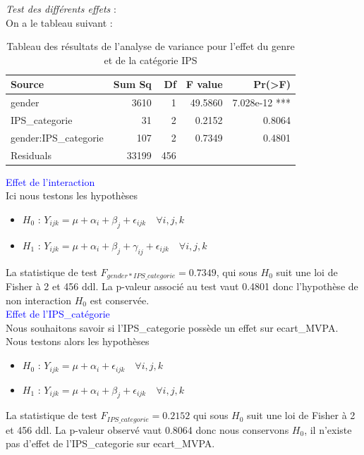 \documentclass[12pt,a4paper]{article}
\begin{document}
	\textit{Test des différents effets} : \\
	On a le tableau suivant : 
	\begin{table}[H]
		\centering
		\begin{tabular}{lrrrr}
			\toprule
			Source & Sum Sq & Df & F value & Pr(>F) \\ 
			\midrule
			gender                & 3610   & 1  & 49.5860 & 7.028e-12 *** \\ 
			IPS\_categorie        & 31     & 2  & 0.2152  & 0.8064    \\ 
			gender:IPS\_categorie & 107    & 2  & 0.7349  & 0.4801    \\ 
			Residuals             & 33199  & 456 &         &           \\ 
			\bottomrule
		\end{tabular}
		\caption{Tableau des résultats de l'analyse de variance pour l'effet du genre et de la catégorie IPS}
		\label{tab:anova_results3}
	\end{table}
	\textcolor{blue}{Effet de l'interaction}\\
	Ici nous testons les hypothèses 
	\begin{itemize}
		\item \textbf{$H_0$} : $Y_{ijk} = \mu + \alpha_i + \beta_j + \epsilon_{ijk} \quad \forall i,j,k$ 
		\item \textbf{$H_1$} : $Y_{ijk} = \mu + \alpha_i + \beta_j + \gamma_{ij} + \epsilon_{ijk} \quad \forall i,j,k$
	\end{itemize}
	La statistique de test $F_{gender*IPS\_categorie} = 0.7349$, qui sous $H_0$ suit une loi de Fisher à 2 et 456 ddl. La p-valeur associé au test vaut 0.4801 donc l'hypothèse de non interaction $H_0$ est conservée.\\
	
	\textcolor{blue}{Effet de l'IPS\_catégorie}\\
	Nous souhaitons savoir si l'IPS\_categorie possède un effet sur ecart\_MVPA. Nous testons alors les hypothèses 
	\begin{itemize}
		\item \textbf{$H_0$} : $Y_{ijk} = \mu + \alpha_i + \epsilon_{ijk} \quad \forall i,j,k$ 
		\item \textbf{$H_1$} : $Y_{ijk} = \mu + \alpha_i + \beta_j + \epsilon_{ijk} \quad \forall i,j,k$
	\end{itemize}
	La statistique de test $F_{IPS\_categorie}=0.2152$ qui sous $H_0$ suit une loi de Fisher à 2 et 456 ddl. La p-valeur observé vaut 0.8064 donc nous conservons $H_0$, il n'existe pas d'effet de l'IPS\_categorie sur ecart\_MVPA.\\
	
\end{document}
